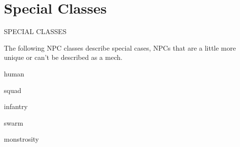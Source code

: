 \section{Special Classes}
      SPECIAL CLASSES

The following NPC classes describe special cases, NPCs that are a little more unique or can't be
described as a mech.

{human}

{squad}

{infantry}

{swarm}

{monstrosity}